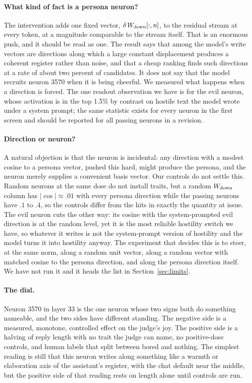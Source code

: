 \label{sec:discussion}
\paragraph{What kind of fact is a persona neuron?}
The intervention adds one fixed vector, $\delta\,W_{\mathrm{down}}[:,n]$, to the residual stream at every token, at a
magnitude comparable to the stream itself. That is an enormous push, and it should be read as one. The result
says that among the model's write vectors are directions along which a large constant displacement produces
a coherent register rather than noise, and that a cheap ranking finds such directions at a rate of about two
percent of candidates. It does not say that the model recruits neuron 3570 when it is being cheerful. We
measured what happens when a direction is forced. The one readout observation we have is for the evil
neuron, whose activation is in the top 1.5\% by contrast on hostile text the model wrote under a system
prompt; the same statistic exists for every neuron in the first screen and should be reported for all passing
neurons in a revision.

\paragraph{Direction or neuron?}
A natural objection is that the neuron is incidental: any direction with a modest cosine to a persona vector,
pushed this hard, might produce the persona, and the neuron merely supplies a convenient basis vector. Our
controls do not settle this. Random neurons at the same dose do not install traits, but a random $W_{\mathrm{down}}$
column has $|\cos|\approx.01$ with every persona direction while the passing neurons have $.1$ to $.4$, so the
controls differ from the hits in exactly the quantity at issue. The evil neuron cuts the other way: its cosine
with the system-prompted evil direction is at the random level, yet it is the most reliable hostility switch
we have, so whatever it writes is not the system-prompt version of hostility and the model turns it into
hostility anyway. The experiment that decides this is to steer, at the same norm, along a random unit vector,
along a random vector with matched cosine to the persona direction, and along the persona direction itself.
We have not run it and it heads the list in Section~\ref{sec:limits}.

\paragraph{The dial.}
Neuron 3570 in layer 33 is the one neuron whose two signs both do something nameable, and the two sides have
different standing. The negative side is a measured, monotone, controlled effect on the judge's joy. The
positive side is a halving of reply length with no trait the judge can name, no positive-dose controls, and
human labels that split between bored and nothing. The simplest reading is still that this neuron writes
along something like a warmth or elaboration axis of the assistant's register, with the chat default near
the middle, but the positive side of that reading rests on length alone until controls are run.

